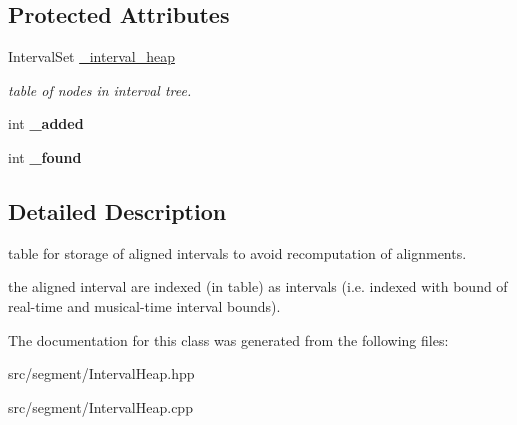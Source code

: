 \subsection*{Protected Attributes}
\begin{DoxyCompactItemize}
\item 
\mbox{\label{classIntervalHeap_a56964ad9a5c60ad550282a6219326681}} 
Interval\+Set \mbox{\hyperlink{classIntervalHeap_a56964ad9a5c60ad550282a6219326681}{\+\_\+interval\+\_\+heap}}
\begin{DoxyCompactList}\small\item\em table of nodes in interval tree. \end{DoxyCompactList}\item 
\mbox{\label{classIntervalHeap_a7347cb18816cc1fe1c53c3727416328d}} 
int {\bfseries \+\_\+added}
\item 
\mbox{\label{classIntervalHeap_ad87165e87b2c1bd7150bc4f8159aef02}} 
int {\bfseries \+\_\+found}
\end{DoxyCompactItemize}


\subsection{Detailed Description}
table for storage of aligned intervals to avoid recomputation of alignments. 

the aligned interval are indexed (in table) as intervals (i.\+e. indexed with bound of real-\/time and musical-\/time interval bounds). 

The documentation for this class was generated from the following files\+:\begin{DoxyCompactItemize}
\item 
src/segment/Interval\+Heap.\+hpp\item 
src/segment/Interval\+Heap.\+cpp\end{DoxyCompactItemize}
